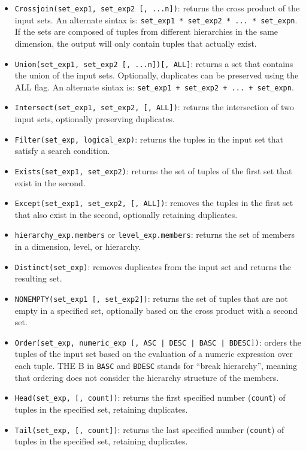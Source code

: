 \begin{itemize}
    \item \texttt{Crossjoin(set\_exp1, set\_exp2 [, ...n])}: returns the cross product of the input sets. An alternate sintax is: \texttt{set\_exp1 * set\_exp2 * ... * set\_expn}. If the sets are composed of tuples from different hierarchies in the same dimension, the output will only contain tuples that actually exist.
    \item \texttt{Union(set\_exp1, set\_exp2 [, ...n])[, ALL]}: returns a set that contains the union of the input sets. Optionally, duplicates can be preserved using the ALL flag. An alternate sintax is: \texttt{set\_exp1 + set\_exp2 + ... + set\_expn}.
    \item \texttt{Intersect(set\_exp1, set\_exp2, [, ALL])}: returns the intersection of two input sets, optionally preserving duplicates.
    \item \texttt{Filter(set\_exp, logical\_exp)}: returns the tuples in the input set that satisfy a search condition.
    \item \texttt{Exists(set\_exp1, set\_exp2)}: returns the set of tuples of the first set that exist in the second.
    \item \texttt{Except(set\_exp1, set\_exp2, [, ALL])}: removes the tuples in the first set that also exist in the second, optionally retaining duplicates.
    \item \texttt{hierarchy\_exp.members} or \texttt{level\_exp.members}: returns the set of members in a dimension, level, or hierarchy.
    \item \texttt{Distinct(set\_exp)}: removes duplicates from the input set and returns the resulting set.
    \item \texttt{NONEMPTY(set\_exp1 [, set\_exp2])}: returns the set of tuples that are not empty in a specified set, optionally based on the cross product with a second set.
    \item \texttt{Order(set\_exp, numeric\_exp [, {ASC | DESC | BASC | BDESC}])}: orders the tuples of the input set based on the evaluation of a numeric expression over each tuple. THE B in \texttt{BASC} and \texttt{BDESC} stands for ``break hierarchy'', meaning that ordering does not consider the hierarchy structure of the members.
    \item \texttt{Head(set\_exp, [, count])}: returns the first specified number (\texttt{count}) of tuples in the specified set, retaining duplicates.
    \item \texttt{Tail(set\_exp, [, count])}: returns the last specified number (\texttt{count}) of tuples in the specified set, retaining duplicates.

\end{itemize}
